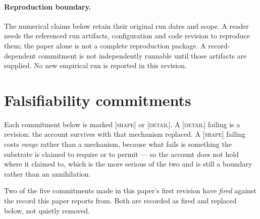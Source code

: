 \documentclass[11pt,a4paper]{article}
\theoremstyle{remark}
\begin{document}
\paragraph{Reproduction boundary.} The numerical claims below retain their
original run dates and scope. A reader needs the referenced run artifacts,
configuration and code revision to reproduce them; the paper alone is not a
complete reproduction package. A record-dependent commitment is not independently
runnable until those artifacts are supplied. No new empirical run is reported
in this revision.

\section{Falsifiability commitments}\label{sec:falsifiability}
Each commitment below is marked \textsc{[shape]} or \textsc{[detail]}. A \textsc{[detail]} failing is a
revision: the account survives with that mechanism replaced. A \textsc{[shape]} failing costs
\emph{range} rather than a mechanism, because what fails is something the substrate is claimed to
require or to permit --- so the account does not hold where it claimed to, which is the more serious of
the two and is still a boundary rather than an annihilation.

Two of the five commitments made in this paper's first revision have \emph{fired} against the record
this paper reports from. Both are recorded as fired and replaced below, not quietly removed.
\end{document}
